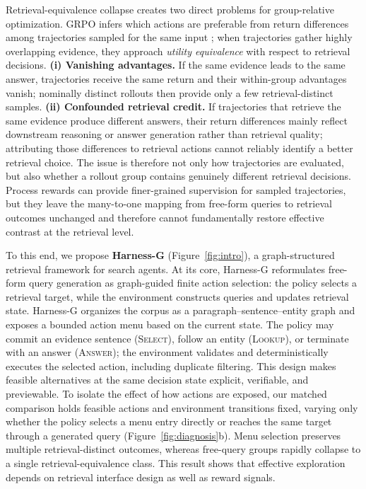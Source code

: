 \documentclass[letterpaper]{article} %
\begin{document}
Retrieval-equivalence collapse creates two direct problems for
group-relative optimization.
GRPO infers which actions are preferable from return differences among
trajectories sampled for the same input
\citep{shao2024deepseekmath}; when trajectories gather highly
overlapping evidence, they approach \emph{utility equivalence} with
respect to retrieval decisions.
\textbf{(i) Vanishing advantages.}
If the same evidence leads to the same answer, trajectories receive the
same return and their within-group advantages vanish; nominally distinct
rollouts then provide only a few retrieval-distinct samples.
\textbf{(ii) Confounded retrieval credit.}
If trajectories that retrieve the same evidence produce different
answers, their return differences mainly reflect downstream reasoning or
answer generation rather than retrieval quality; attributing those
differences to retrieval actions cannot reliably identify a better
retrieval choice.
The issue is therefore not only how trajectories are evaluated, but also
whether a rollout group contains genuinely different retrieval
decisions.
Process rewards can provide finer-grained supervision for sampled
trajectories, but they leave the many-to-one mapping from free-form
queries to retrieval outcomes unchanged and therefore cannot
fundamentally restore effective contrast at the retrieval level.

To this end, we propose \textbf{Harness-G}
(Figure~\ref{fig:intro}), a graph-structured retrieval framework for
search agents.
At its core, Harness-G reformulates free-form query generation as
graph-guided finite action selection: the policy selects a retrieval
target, while the environment constructs queries and updates retrieval
state.
Harness-G organizes the corpus as a paragraph--sentence--entity graph
and exposes a bounded action menu based on the current state.
The policy may commit an evidence sentence (\textsc{Select}), follow an
entity (\textsc{Lookup}), or terminate with an answer
(\textsc{Answer}); the environment validates and deterministically
executes the selected action, including duplicate filtering.
This design makes feasible alternatives at the same decision state
explicit, verifiable, and previewable.
To isolate the effect of how actions are exposed, our matched comparison
holds feasible actions and environment transitions fixed, varying only
whether the policy selects a menu entry directly or reaches the same
target through a generated query (Figure~\ref{fig:diagnosis}b).
Menu selection preserves multiple retrieval-distinct outcomes, whereas
free-query groups rapidly collapse to a single retrieval-equivalence
class.
This result shows that effective exploration depends on retrieval
interface design as well as reward signals.
\end{document}
